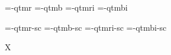 

\ifx\sizespec\undefined \def\sizespec{}\fi
\ifx\font\corkencoded {}\else {}\fi

\ifx\font\unicoded  {} 
\else

\font\tenrm=\tmp-qtmr  \sizespec
\font\tenbf=\tmp-qtmb  \sizespec
\font\tenit=\tmp-qtmri \sizespec
\font\tenbi=\tmp-qtmbi \sizespec

\font\tenrmc=\tmp-qtmr-sc  \sizespec
\font\tenbfc=\tmp-qtmb-sc  \sizespec
\font\tenitc=\tmp-qtmri-sc \sizespec
\font\tenbic=\tmp-qtmbi-sc \sizespec

\fi

\tenrm

\ifx\regfontdefault\undefined \else
   \regfontdefault
   \regfont\tenrmc \regfont\tenitc
   \regfont\tenbfc \regfont\tenbic
\fi

\def\caps#1{{\escapechar=-1 \expandafter}%
  \expandafter\csname\expandafter\tenonlytext\string#1c\endcsname}
\def\tenonlytext{ten}

\ifx\font\corkencoded\else \ifx\font\unicoded\else  \fi\fi
\ifx\mathpreloaded X\else  \fi                     


